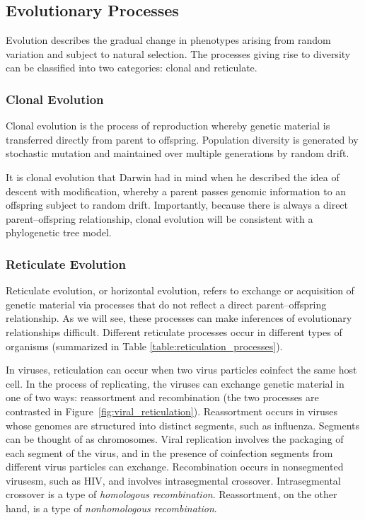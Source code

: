 \subsection{Evolutionary Processes}

Evolution describes the gradual change in phenotypes arising from random variation and subject to natural selection.
The processes giving rise to diversity can be classified into two categories: clonal and reticulate.

\subsubsection{Clonal Evolution}

Clonal evolution is the process of reproduction whereby genetic material is transferred directly from parent to offspring.
Population diversity is generated by stochastic mutation and maintained over multiple generations by random drift.

It is clonal evolution that Darwin had in mind when he described the idea of descent with modification, whereby a parent passes genomic information to an offspring subject to random drift.
Importantly, because there is always a direct parent--offspring relationship, clonal evolution will be consistent with a phylogenetic tree model.

\subsubsection{Reticulate Evolution}

Reticulate evolution, or horizontal evolution, refers to exchange or acquisition of genetic material via processes that do not reflect a direct parent--offspring relationship.
As we will see, these processes can make inferences of evolutionary relationships difficult.
Different reticulate processes occur in different types of organisms (summarized in Table \ref{table:reticulation_processes}).

In viruses, reticulation can occur when two virus particles coinfect the same host cell.
In the process of replicating, the viruses can exchange genetic material in one of two ways: reassortment and recombination (the two processes are contrasted in Figure~\ref{fig:viral_reticulation}).
Reassortment occurs in viruses whose genomes are structured into distinct segments, such as influenza.
Segments can be thought of as chromosomes.
Viral replication involves the packaging of each segment of the virus, and in the presence of coinfection segments from different virus particles can exchange.
Recombination occurs in nonsegmented virusesm, such as HIV, and involves intrasegmental crossover.
Intrasegmental crossover is a type of \emph{homologous recombination}.
Reassortment, on the other hand, is a type of \emph{nonhomologous recombination}.

